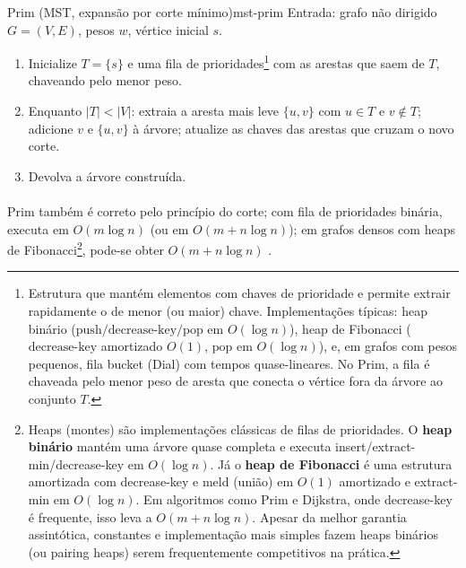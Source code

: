 \documentclass[12pt,a4paper]{article}
\def\texttt#1{#1}%
\def\emph#1{#1}%
\begin{document}
\begin{algobox}{Prim (MST, expansão por corte mínimo)}{mst-prim}
    Entrada: grafo não dirigido \(G=(V,E)\), pesos \(w\), vértice inicial \(s\).
    \begin{enumerate}\setlength{\itemsep}{2pt}
        \item Inicialize \(T=\{s\}\) e uma fila de prioridades\footnote{Estrutura que mantém elementos com chaves de prioridade e permite extrair rapidamente o de menor (ou maior) chave. Implementações típicas: \emph{heap} binário (\(\mathrm{push}/\mathrm{decrease\text{-}key}/\mathrm{pop}\) em \(O(\log n)\)), \emph{heap} de Fibonacci (\(\mathrm{decrease\text{-}key}\) amortizado \(O(1)\), \(\mathrm{pop}\) em \(O(\log n)\)), e, em grafos com pesos pequenos, fila bucket (Dial) com tempos quase-lineares. No Prim, a fila é chaveada pelo menor peso de aresta que conecta o vértice fora da árvore ao conjunto \(T\).} com as arestas que saem de \(T\), chaveando pelo menor peso.
        \item Enquanto \(|T|<|V|\): extraia a aresta mais leve \(\{u,v\}\) com \(u\in T\) e \(v\notin T\); adicione \(v\) e \(\{u,v\}\) à árvore; atualize as chaves das arestas que cruzam o novo corte.
        \item Devolva a árvore construída.
    \end{enumerate}
\end{algobox}

\paragraph{}Prim também é correto pelo princípio do corte; com fila de prioridades binária, executa em \(O(m\log n)\) (ou em \(O(m+n\log n)\)); em grafos densos com \emph{heaps} de Fibonacci\footnote{\emph{Heaps} (montes) são implementações clássicas de filas de prioridades. O \textbf{heap binário} mantém uma árvore quase completa e executa \texttt{insert}/\texttt{extract-min}/\texttt{decrease-key} em \(O(\log n)\). Já o \textbf{heap de Fibonacci} é uma estrutura amortizada com \texttt{decrease-key} e \texttt{meld} (união) em \(O(1)\) amortizado e \texttt{extract-min} em \(O(\log n)\). Em algoritmos como Prim e Dijkstra, onde \texttt{decrease-key} é frequente, isso leva a \(O(m+n\log n)\). Apesar da melhor garantia assintótica, constantes e implementação mais simples fazem heaps binários (ou \emph{pairing heaps}) serem frequentemente competitivos na prática.}, pode-se obter \(O(m+n\log n)\) \cite{cormen2009,kleinberg2006,west2001introduction,diestel2017graph}.
\end{document}
